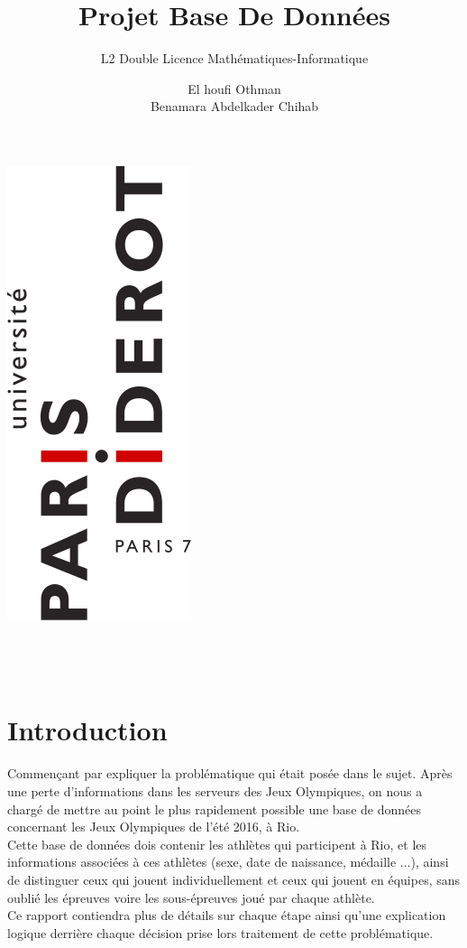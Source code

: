 \documentclass[]{scrreprt}
\title{Projet Base De Données}
\subtitle{L2 Double Licence Mathématiques-Informatique}
\author{El houfi Othman \\ Benamara Abdelkader Chihab}
\begin{document}
	\makeatletter
	\begin{titlepage}
		\begin{center}
			\includegraphics[scale=0.3]{logo-up7d.png}\\[4ex]\vspace{2cm}
			{\huge \bfseries  \@title }\\[2ex]\vspace{0.5cm}
			{\large  \@subtitle }\\[10ex] \vspace{2cm}
			{\large  \@author}\\[50ex] 
			{\large \@date}
		\end{center}
	\end{titlepage}
	\makeatother
	
	\tableofcontents
	
	\chapter{Introduction}
	\label{Chapter1}
	
		{\large Commençant par expliquer la problématique qui était posée dans le sujet. Après une perte d’informations dans les serveurs des Jeux Olympiques, on nous a chargé de mettre au point le plus rapidement possible une base de données concernant les Jeux Olympiques de l’été 2016, à Rio.\\
		Cette base de données dois contenir les athlètes qui participent à Rio, et les informations associées à ces athlètes (sexe, date de naissance, médaille ...), ainsi de distinguer ceux qui jouent individuellement et ceux qui jouent en équipes, sans oublié les épreuves voire les sous-épreuves joué par chaque athlète.\\
		Ce rapport contiendra plus de détails sur chaque étape ainsi qu’une explication logique derrière chaque décision prise lors traitement de cette problématique.}
		
\end{document}
